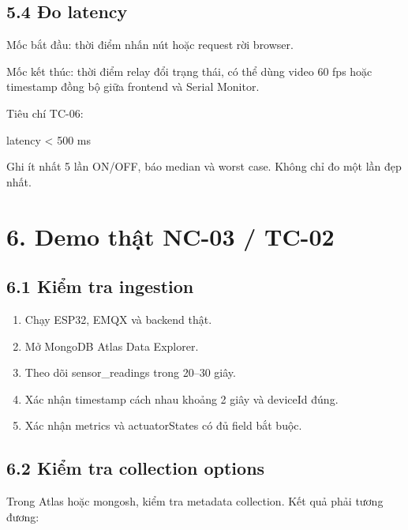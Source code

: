 \documentclass[11pt,oneside,openany]{book}
\renewcommand{\texttt}[1]{{\ttfamily\small #1}}
\newenvironment{Shaded}{\begin{snugshade}}{\end{snugshade}}
\newcommand{\NormalTok}[1]{\textcolor[rgb]{0.81,0.81,0.76}{#1}}
\renewenvironment{Shaded}{%
  \def\FrameCommand{\fboxsep=8pt\colorbox{shadecolor}}%
  \MakeFramed{\advance\hsize-\width\FrameRestore}%
}{\endMakeFramed}
\providecommand{\tightlist}{\setlength{\itemsep}{1pt}\setlength{\parskip}{0pt}}
\begin{document}
\subsection{5.4 Đo latency}\label{54-ux111o-latency}

Mốc bắt đầu: thời điểm nhấn nút hoặc request rời browser.

Mốc kết thúc: thời điểm relay đổi trạng thái, có thể dùng video 60 fps
hoặc timestamp đồng bộ giữa frontend và Serial Monitor.

Tiêu chí TC-06:

\begin{Shaded}
\begin{Highlighting}[]
\NormalTok{latency \textless{} 500 ms}
\end{Highlighting}
\end{Shaded}

Ghi ít nhất 5 lần ON/OFF, báo median và worst case. Không chỉ đo một lần
đẹp nhất.

\section{6. Demo thật NC-03 /
TC-02}\label{6-demo-thux1eadt-nc-03--tc-02}

\subsection{6.1 Kiểm tra ingestion}\label{61-kiux1ec3m-tra-ingestion}

\begin{enumerate}
\def\labelenumi{\arabic{enumi}.}
\tightlist
\item
  Chạy ESP32, EMQX và backend thật.
\item
  Mở MongoDB Atlas Data Explorer.
\item
  Theo dõi \texttt{sensor\_readings} trong 20--30 giây.
\item
  Xác nhận timestamp cách nhau khoảng 2 giây và deviceId đúng.
\item
  Xác nhận metrics và actuatorStates có đủ field bắt buộc.
\end{enumerate}

\subsection{6.2 Kiểm tra collection
options}\label{62-kiux1ec3m-tra-collection-options}

Trong Atlas hoặc mongosh, kiểm tra metadata collection. Kết quả phải
tương đương:
\end{document}
